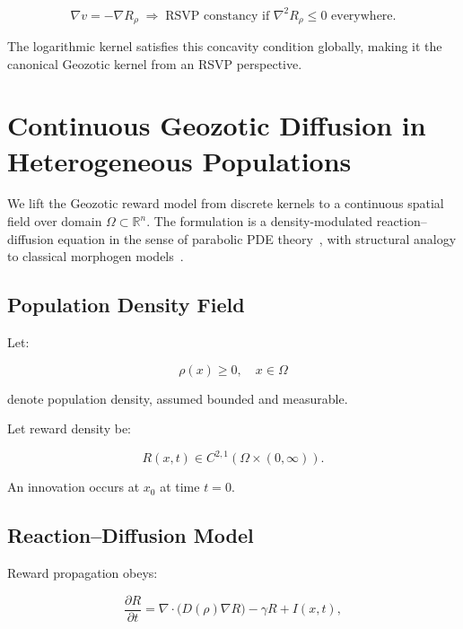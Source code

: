 \documentclass[12pt,a4paper]{article}
\theoremstyle{definition}
\begin{document}
\begin{equation}
  \nabla v = -\nabla R_\rho \;\Longrightarrow\; \text{RSVP constancy if }
  \nabla^2 R_\rho \leq 0 \text{ everywhere.}
\end{equation}

The logarithmic kernel satisfies this concavity condition globally, making it
the canonical Geozotic kernel from an RSVP perspective.

\section{Continuous Geozotic Diffusion in Heterogeneous Populations}
\label{sec:geozotic_pde}

We lift the Geozotic reward model from discrete kernels
to a continuous spatial field over domain
$\Omega \subset \mathbb{R}^n$.
The formulation is a density-modulated reaction–diffusion equation
in the sense of parabolic PDE theory~\citep{evans2010},
with structural analogy to classical morphogen models~\citep{turing1952}.

\subsection{Population Density Field}

Let:

\begin{equation}
  \rho(x) \ge 0, \quad x \in \Omega
\end{equation}

denote population density, assumed bounded and measurable.

Let reward density be:

\begin{equation}
  R(x,t) \in C^{2,1}(\Omega \times (0,\infty)).
\end{equation}

An innovation occurs at $x_0$ at time $t=0$.

\subsection{Reaction–Diffusion Model}

Reward propagation obeys:

\begin{equation}
  \frac{\partial R}{\partial t}
  =
  \nabla \cdot \big( D(\rho) \nabla R \big)
  - \gamma R
  + I(x,t),
  \label{eq:geozotic_pde}
\end{equation}
\end{document}
